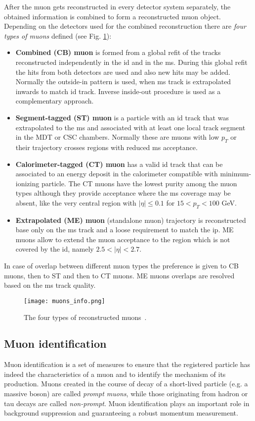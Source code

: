     After the muon gets reconstructed in every detector system separately, the obtained information is combined to form a reconstructed muon object. Depending on the detectors used for the combined reconstruction there are \textit{four types of muons} defined (see Fig. \ref{fig::muon_combined}):
    \begin{itemize}
	\item \textbf{Combined (CB) muon} is formed from a global refit of the tracks reconstructed independently in the \gls{id} and in the \gls{ms}. During this global refit the hits from both detectors are used and also new hits may be added. Normally the outside-in pattern is used, when \gls{ms} track is extrapolated inwards to match \gls{id} track. Inverse inside-out procedure is used as a complementary approach.
	\item \textbf{Segment-tagged (ST) muon} is a particle with an \gls{id} track that was extrapolated to the \gls{ms} and associated with at least one local track segment in the MDT or CSC chambers. Normally these are muons with low $p_T$ or their trajectory crosses regions with reduced \gls{ms} acceptance.
	\item \textbf{Calorimeter-tagged (CT) muon} has a valid \gls{id} track that can be associated to an energy deposit in the calorimeter compatible with minimum-ionizing particle. The CT muons have the lowest purity among the muon types although they provide acceptance where the \gls{ms} coverage may be absent, like the very central region with $|\eta| \le 0.1$ for $15<p_T<100$ GeV. 
	\item \textbf{Extrapolated (ME) muon} (standalone muon) trajectory is reconstructed base only on the \gls{ms} track and a loose requirement to match the \gls{ip}. ME muons allow to extend the muon acceptance to the region which is not covered by the \gls{id}, namely $2.5<|\eta| < 2.7$.
	\end{itemize}
	In case of overlap between different muon types the preference is given to CB muons, then to ST and then to CT muons. ME muons overlaps are resolved based on the \gls{ms} track quality.
      \begin{figure}[htbp]
	\centering
	\texttt{[image: muons\_info.png]}
	\caption[Reconstructed muon types]{The four types of reconstructed muons~\cite{muons_reco1}.}
	\label{fig::muon_combined}
	\end{figure}
     \subsection{Muon identification}
     Muon identification is a set of measures to ensure that the registered particle has indeed the characteristics of a muon and to identify the mechanism of its production. Muons created in the course of decay of a short-lived particle (e.g. a massive boson) are called \textit{prompt muons}, while those originating from hadron or tau decays are called \textit{non-prompt}. Muon identification plays an important role in background suppression and guaranteeing a robust momentum measurement.
     
